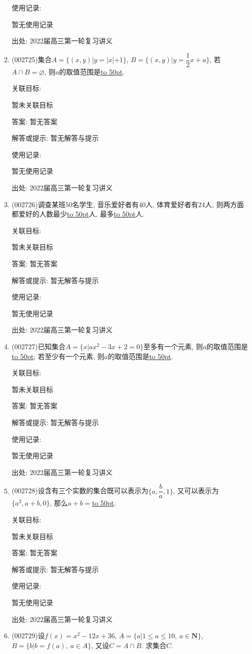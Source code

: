 \documentclass[10pt,a4paper]{article}
\newcommand{\blank}[1]{\underline{\hbox to #1pt{}}}
\begin{document}
\begin{enumerate}[1.]
使用记录:

暂无使用记录


出处: 2022届高三第一轮复习讲义
\item { (002725)}集合$A=\{(x,y)|y=|x|+1\}$, $B=\{(x,y)|y=\dfrac12x+a\}$, 若$A\cap B=\varnothing$, 则$a$的取值范围是\blank{50}.


关联目标:

暂未关联目标

答案: 暂无答案

解答或提示: 暂无解答与提示

使用记录:

暂无使用记录


出处: 2022届高三第一轮复习讲义
\item { (002726)}调查某班$50$名学生, 音乐爱好者有$40$人, 体育爱好者有$24$人, 则两方面都爱好的人数最少\blank{50}人, 最多\blank{50}人.


关联目标:

暂未关联目标

答案: 暂无答案

解答或提示: 暂无解答与提示

使用记录:

暂无使用记录


出处: 2022届高三第一轮复习讲义
\item { (002727)}已知集合$A=\{x|ax^2-3x+2=0\}$至多有一个元素, 则$a$的取值范围是\blank{50}; 若至少有一个元素, 则$a$的取值范围是\blank{50}.


关联目标:

暂未关联目标

答案: 暂无答案

解答或提示: 暂无解答与提示

使用记录:

暂无使用记录


出处: 2022届高三第一轮复习讲义
\item { (002728)}设含有三个实数的集合既可以表示为$\{a,\dfrac ba,1\}$, 又可以表示为$\{a^2,a+b,0\}$, 那么$a+b=$\blank{50}.


关联目标:

暂未关联目标

答案: 暂无答案

解答或提示: 暂无解答与提示

使用记录:

暂无使用记录


出处: 2022届高三第一轮复习讲义
\item { (002729)}设$f(x)=x^2-12x+36$, $A=\{a|1\le a\le 10, \ a\in \mathbf{N}\}$, $B=\{b|b=f(a),\ a\in A\}$, 又设$C=A\cap B$. 求集合$C$.



\end{enumerate}
\end{document}
